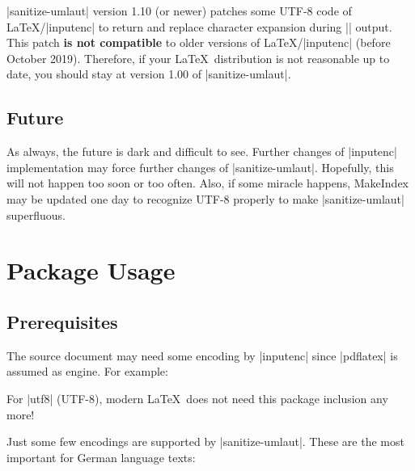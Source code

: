 \documentclass[a4paper,11pt]{ltxdoc}
\begin{document}
|sanitize-umlaut| version 1.10 (or newer) patches some UTF-8 code of
\LaTeX/|inputenc| to return and replace character expansion during |\index| output.
This patch \textbf{is not compatible} to older versions of \LaTeX/|inputenc| (before October 2019).
Therefore, if your \LaTeX\ distribution is not reasonable up to date, you
should stay at version 1.00 of |sanitize-umlaut|.

\subsection{Future}
As always, the future is dark and difficult to see. Further changes of
|inputenc| implementation may force further changes of |sanitize-umlaut|.
Hopefully, this will not happen too soon or too often.
Also, if some miracle happens, MakeIndex may be updated one day to
recognize UTF-8 properly to make |sanitize-umlaut| superfluous.


\section{Package Usage}%

\subsection{Prerequisites}
The source document may need some encoding by |inputenc| since |pdflatex|
is assumed as engine. For example:

\begin{dispListing}
\usepackage[latin1]{inputenc}
\end{dispListing}

For |utf8| (UTF-8), modern \LaTeX\ does not need this package inclusion any more!

Just some few encodings are supported by |sanitize-umlaut|.
These are the most important for German language texts:

\end{document}
